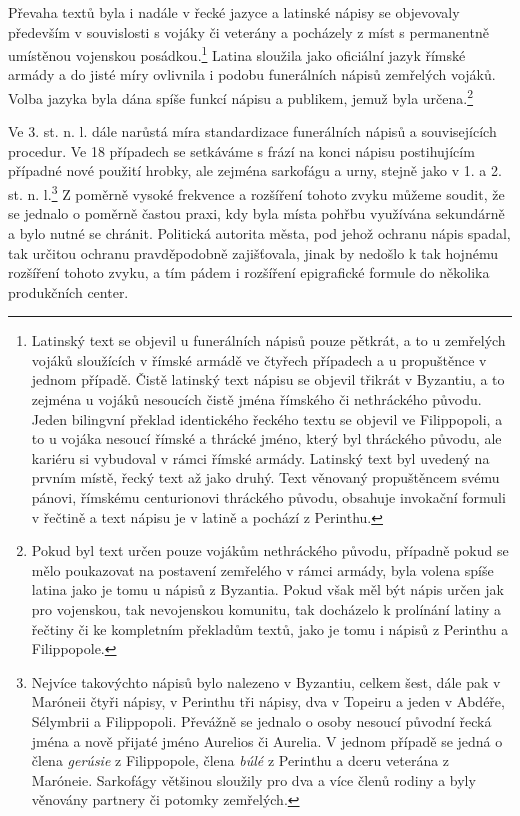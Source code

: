 Převaha textů byla i nadále v řecké jazyce a latinské nápisy se objevovaly především v souvislosti s vojáky či veterány a pocházely z míst s permanentně umístěnou vojenskou posádkou.\footnote{Latinský text se objevil u funerálních nápisů pouze pětkrát, a to u zemřelých vojáků sloužících v římské armádě ve čtyřech případech a u propuštěnce v jednom případě. Čistě latinský text nápisu se objevil třikrát v Byzantiu, a to zejména u vojáků nesoucích čistě jména římského či nethráckého původu. Jeden bilingvní překlad identického řeckého textu se objevil ve Filippopoli, a to u vojáka nesoucí římské a thrácké jméno, který byl thráckého původu, ale kariéru si vybudoval v rámci římské armády. Latinský text byl uvedený na prvním místě, řecký text až jako druhý. Text věnovaný propuštěncem svému pánovi, římskému centurionovi thráckého původu, obsahuje invokační formuli v řečtině a text nápisu je v latině a pochází z Perinthu.} Latina sloužila jako oficiální jazyk římské armády a do jisté míry ovlivnila i podobu funerálních nápisů zemřelých vojáků. Volba jazyka byla dána spíše funkcí nápisu a publikem, jemuž byla určena.\footnote{Pokud byl text určen pouze vojákům nethráckého původu, případně pokud se mělo poukazovat na postavení zemřelého v rámci armády, byla volena spíše latina jako je tomu u nápisů z Byzantia. Pokud však měl být nápis určen jak pro vojenskou, tak nevojenskou komunitu, tak docházelo k prolínání latiny a řečtiny či ke kompletním překladům textů, jako je tomu i nápisů z Perinthu a Filippopole.}

Ve 3. st. n. l. dále narůstá míra standardizace funerálních nápisů a souvisejících procedur. Ve 18 případech se setkáváme s frází na konci nápisu postihujícím případné nové použití hrobky, ale zejména sarkofágu a urny, stejně jako v 1. a 2. st. n. l.\footnote{Nejvíce takovýchto nápisů bylo nalezeno v Byzantiu, celkem šest, dále pak v Maróneii čtyři nápisy, v Perinthu tři nápisy, dva v Topeiru a jeden v Abdéře, Sélymbrii a Filippopoli. Převážně se jednalo o osoby nesoucí původní řecká jména a nově přijaté jméno Aurelios či Aurelia. V jednom případě se jedná o člena {\em gerúsie} z Filippopole, člena {\em búlé} z Perinthu a dceru veterána z Maróneie. Sarkofágy většinou sloužily pro dva a více členů rodiny a byly věnovány partnery či potomky zemřelých.} Z poměrně vysoké frekvence a rozšíření tohoto zvyku můžeme soudit, že se jednalo o poměrně častou praxi, kdy byla místa pohřbu využívána sekundárně a bylo nutné se chránit. Politická autorita města, pod jehož ochranu nápis spadal, tak určitou ochranu pravděpodobně zajišťovala, jinak by nedošlo k tak hojnému rozšíření tohoto zvyku, a tím pádem i rozšíření epigrafické formule do několika produkčních center.

